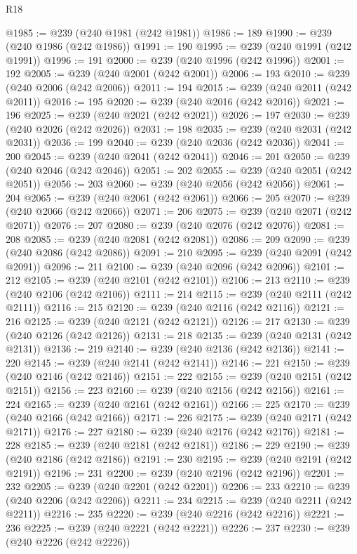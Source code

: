 \begin{lexlean}{R18}
\begin{coremodule}
@1985 := @239 (@240 @1981 (@242 @1981))
@1986 := 189
@1990 := @239 (@240 @1986 (@242 @1986))
@1991 := 190
@1995 := @239 (@240 @1991 (@242 @1991))
@1996 := 191
@2000 := @239 (@240 @1996 (@242 @1996))
@2001 := 192
@2005 := @239 (@240 @2001 (@242 @2001))
@2006 := 193
@2010 := @239 (@240 @2006 (@242 @2006))
@2011 := 194
@2015 := @239 (@240 @2011 (@242 @2011))
@2016 := 195
@2020 := @239 (@240 @2016 (@242 @2016))
@2021 := 196
@2025 := @239 (@240 @2021 (@242 @2021))
@2026 := 197
@2030 := @239 (@240 @2026 (@242 @2026))
@2031 := 198
@2035 := @239 (@240 @2031 (@242 @2031))
@2036 := 199
@2040 := @239 (@240 @2036 (@242 @2036))
@2041 := 200
@2045 := @239 (@240 @2041 (@242 @2041))
@2046 := 201
@2050 := @239 (@240 @2046 (@242 @2046))
@2051 := 202
@2055 := @239 (@240 @2051 (@242 @2051))
@2056 := 203
@2060 := @239 (@240 @2056 (@242 @2056))
@2061 := 204
@2065 := @239 (@240 @2061 (@242 @2061))
@2066 := 205
@2070 := @239 (@240 @2066 (@242 @2066))
@2071 := 206
@2075 := @239 (@240 @2071 (@242 @2071))
@2076 := 207
@2080 := @239 (@240 @2076 (@242 @2076))
@2081 := 208
@2085 := @239 (@240 @2081 (@242 @2081))
@2086 := 209
@2090 := @239 (@240 @2086 (@242 @2086))
@2091 := 210
@2095 := @239 (@240 @2091 (@242 @2091))
@2096 := 211
@2100 := @239 (@240 @2096 (@242 @2096))
@2101 := 212
@2105 := @239 (@240 @2101 (@242 @2101))
@2106 := 213
@2110 := @239 (@240 @2106 (@242 @2106))
@2111 := 214
@2115 := @239 (@240 @2111 (@242 @2111))
@2116 := 215
@2120 := @239 (@240 @2116 (@242 @2116))
@2121 := 216
@2125 := @239 (@240 @2121 (@242 @2121))
@2126 := 217
@2130 := @239 (@240 @2126 (@242 @2126))
@2131 := 218
@2135 := @239 (@240 @2131 (@242 @2131))
@2136 := 219
@2140 := @239 (@240 @2136 (@242 @2136))
@2141 := 220
@2145 := @239 (@240 @2141 (@242 @2141))
@2146 := 221
@2150 := @239 (@240 @2146 (@242 @2146))
@2151 := 222
@2155 := @239 (@240 @2151 (@242 @2151))
@2156 := 223
@2160 := @239 (@240 @2156 (@242 @2156))
@2161 := 224
@2165 := @239 (@240 @2161 (@242 @2161))
@2166 := 225
@2170 := @239 (@240 @2166 (@242 @2166))
@2171 := 226
@2175 := @239 (@240 @2171 (@242 @2171))
@2176 := 227
@2180 := @239 (@240 @2176 (@242 @2176))
@2181 := 228
@2185 := @239 (@240 @2181 (@242 @2181))
@2186 := 229
@2190 := @239 (@240 @2186 (@242 @2186))
@2191 := 230
@2195 := @239 (@240 @2191 (@242 @2191))
@2196 := 231
@2200 := @239 (@240 @2196 (@242 @2196))
@2201 := 232
@2205 := @239 (@240 @2201 (@242 @2201))
@2206 := 233
@2210 := @239 (@240 @2206 (@242 @2206))
@2211 := 234
@2215 := @239 (@240 @2211 (@242 @2211))
@2216 := 235
@2220 := @239 (@240 @2216 (@242 @2216))
@2221 := 236
@2225 := @239 (@240 @2221 (@242 @2221))
@2226 := 237
@2230 := @239 (@240 @2226 (@242 @2226))

\end{coremodule}
\end{lexlean}

